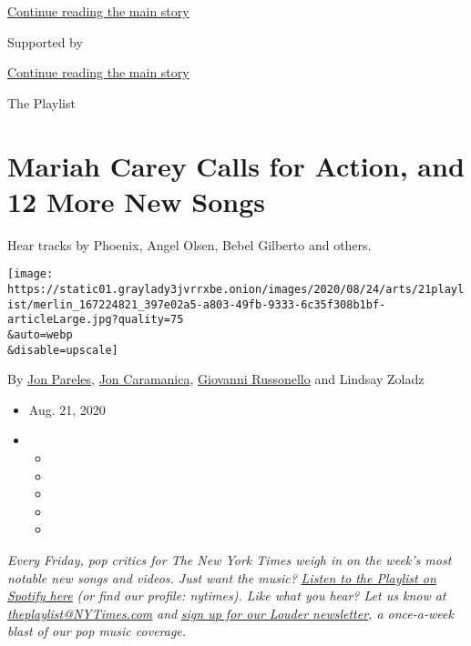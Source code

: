 \protect\hyperlink{after-top}{Continue reading the main story}

Supported by

\protect\hyperlink{after-sponsor}{Continue reading the main story}

The Playlist

\hypertarget{mariah-carey-calls-for-action-and-12-more-new-songs}{%
\section{Mariah Carey Calls for Action, and 12 More New
Songs}\label{mariah-carey-calls-for-action-and-12-more-new-songs}}

Hear tracks by Phoenix, Angel Olsen, Bebel Gilberto and others.

\texttt{[image: https://static01.graylady3jvrrxbe.onion/images/2020/08/24/arts/21playlist/merlin\_167224821\_397e02a5-a803-49fb-9333-6c35f308b1bf-articleLarge.jpg?quality=75\\\&auto=webp\\\&disable=upscale]}

By \href{https://www.nytimes3xbfgragh.onion/by/jon-pareles}{Jon
Pareles},
\href{https://www.nytimes3xbfgragh.onion/by/jon-caramanica}{Jon
Caramanica},
\href{https://www.nytimes3xbfgragh.onion/by/giovanni-russonello}{Giovanni
Russonello} and Lindsay Zoladz

\begin{itemize}
\item
  Aug. 21, 2020
\item
  \begin{itemize}
  \item
  \item
  \item
  \item
  \item
  \end{itemize}
\end{itemize}

\emph{Every Friday, pop critics for The New York Times weigh in on the
week's most notable new songs and videos. Just want the music?}
\href{https://open.spotify.com/playlist/01oygvLrsZCaxLSGUPWls3?si=rMOznFH3Qa2V90_zlu1I_Q}{\emph{Listen
to the Playlist on Spotify here}} \emph{(or find our profile: nytimes).
Like what you hear? Let us know at}
\href{mailto:theplaylist@NYTimes.com}{\emph{theplaylist@NYTimes.com}}
\emph{and}
\href{https://www.nytimes3xbfgragh.onion/newsletters/louder?module=inline}{\emph{sign
up for our Louder newsletter}}\emph{, a once-a-week blast of our pop
music coverage.}

